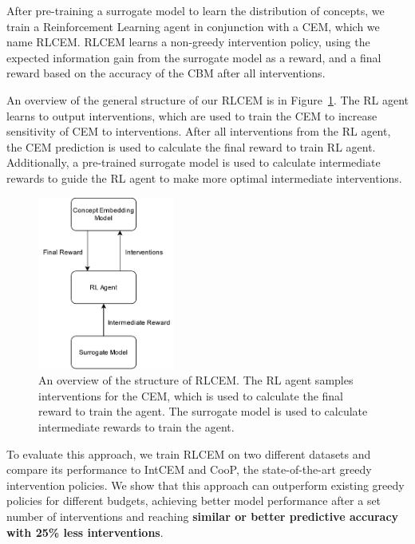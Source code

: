 After pre-training a surrogate model to learn the distribution of concepts,
we train a Reinforcement Learning agent in conjunction with a CEM, which we name RLCEM.
RLCEM learns a 
non-greedy intervention policy, using
the expected information gain from the surrogate model
as a reward, and a final reward based on the 
accuracy of the CBM after all interventions.


An overview of the general structure of our RLCEM is in Figure~\ref{fig:rlcem-overview}.
The RL agent learns to output interventions, which are 
used to train the CEM to increase sensitivity of 
CEM to interventions. After all interventions from the RL agent,
the CEM prediction is used to calculate the final
reward to train RL agent. Additionally, a pre-trained surrogate model
is used to calculate intermediate rewards to guide the RL agent to make more optimal intermediate interventions.

\begin{figure}[!ht]
    \centering
    \includegraphics[width=0.4\textwidth]{figs/method/rlcem_overview.png}
    \caption{An overview of the structure of RLCEM. The RL agent samples interventions for the CEM, which is used to calculate
    the final reward to train the agent. The surrogate model is used to calculate intermediate rewards
    to train the agent.}
    \label{fig:rlcem-overview}
\end{figure}

To evaluate this approach, we train RLCEM on two different datasets
and compare its performance to IntCEM and CooP,
the state-of-the-art greedy intervention policies.
We show that this approach can outperform existing greedy policies
for different budgets, achieving better model performance
after a set number of interventions and reaching \textbf{similar or better
predictive accuracy with 25\% less interventions}.



